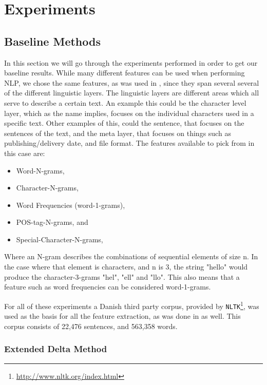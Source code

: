 \section{Experiments} \label{sec:experiments}


\subsection{Baseline Methods}

In this section we will go through the experiments performed in order to get
our baseline results. While many different features can be used when performing
\gls{NLP}, we chose the same features, as was used in \cite{US}, since they
span several several of the different linguistic layers. The linguistic
layers are different areas which all serve to describe a certain text. An
example this could be the character level layer, which as the name implies,
focuses on the individual characters used in a specific text. Other examples
of this, could the sentence, that focuses on the sentences of the text,
and the meta layer, that focuses on things such as publishing/delivery date,
and file format. The features available to pick from in this case are:

\begin{itemize}
    \item Word-N-grams,
    \item Character-N-grams,
    \item Word Frequencies (word-1-grams),
    \item \gls{POS}-tag-N-grams, and
    \item Special-Character-N-grams,
\end{itemize}

Where an N-gram describes the combinations of sequential elements of size n. In
the case where that element is characters, and n is 3, the string "hello" would
produce the character-3-grams "hel", "ell" and "llo". This also means that a
feature such as word frequencies can be considered word-1-grams.

For all of these experiments a Danish third party corpus, provided by
\texttt{NLTK}\footnote{\url{http://www.nltk.org/index.html}}, was used as the
basis for all the feature extraction, as was done in \cite{US} as well. This
corpus consists of 22,476 sentences, and 563,358 words.


\subsubsection{Extended Delta Method}

